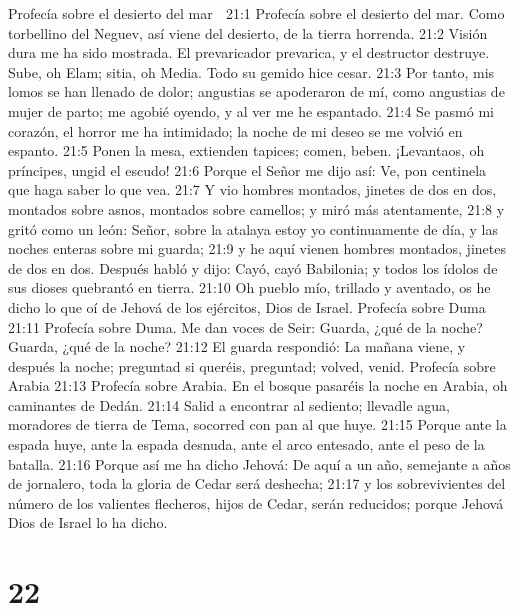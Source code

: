 Profecía sobre el desierto del mar  

21:1 Profecía sobre el desierto del mar. Como torbellino del Neguev, así viene del desierto, de la tierra horrenda.  
21:2 Visión dura me ha sido mostrada. El prevaricador prevarica, y el destructor destruye. Sube, oh Elam; sitia, oh Media. Todo su gemido hice cesar.  
21:3 Por tanto, mis lomos se han llenado de dolor; angustias se apoderaron de mí, como angustias de mujer de parto; me agobié oyendo, y al ver me he espantado.  
21:4 Se pasmó mi corazón, el horror me ha intimidado; la noche de mi deseo se me volvió en espanto.  
21:5 Ponen la mesa, extienden tapices; comen, beben. ¡Levantaos, oh príncipes, ungid el escudo!  
21:6 Porque el Señor me dijo así: Ve, pon centinela que haga saber lo que vea.  
21:7 Y vio hombres montados, jinetes de dos en dos, montados sobre asnos, montados sobre camellos; y miró más atentamente,  
21:8 y gritó como un león: Señor, sobre la atalaya estoy yo continuamente de día, y las noches enteras sobre mi guarda;  
21:9 y he aquí vienen hombres montados, jinetes de dos en dos. Después habló y dijo: Cayó, cayó Babilonia; y todos los ídolos de sus dioses quebrantó en tierra.  
21:10 Oh pueblo mío, trillado y aventado, os he dicho lo que oí de Jehová de los ejércitos, Dios de Israel.  
Profecía sobre Duma  
21:11 Profecía sobre Duma. Me dan voces de Seir: Guarda, ¿qué de la noche? Guarda, ¿qué de la noche?  
21:12 El guarda respondió: La mañana viene, y después la noche; preguntad si queréis, preguntad; volved, venid.  
Profecía sobre Arabia  
21:13 Profecía sobre Arabia. En el bosque pasaréis la noche en Arabia, oh caminantes de Dedán.  
21:14 Salid a encontrar al sediento; llevadle agua, moradores de tierra de Tema, socorred con pan al que huye.  
21:15 Porque ante la espada huye, ante la espada desnuda, ante el arco entesado, ante el peso de la batalla.  
21:16 Porque así me ha dicho Jehová: De aquí a un año, semejante a años de jornalero, toda la gloria de Cedar será deshecha;  
21:17 y los sobrevivientes del número de los valientes flecheros, hijos de Cedar, serán reducidos; porque Jehová Dios de Israel lo ha dicho.  

\chapter{22}


